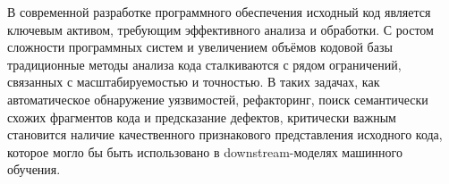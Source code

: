 \documentclass[../document.tex]{subfiles}
\begin{document}
    \par В современной разработке программного обеспечения исходный код является ключевым активом, требующим эффективного анализа и обработки. С ростом сложности программных систем и увеличением объёмов кодовой базы традиционные методы анализа кода сталкиваются с рядом ограничений, связанных с масштабируемостью и точностью. В таких задачах, как автоматическое обнаружение уязвимостей, рефакторинг, поиск семантически схожих фрагментов кода и предсказание дефектов, критически важным становится наличие качественного признакового представления исходного кода, которое могло бы быть использовано в downstream-моделях машинного обучения.
\end{document}
